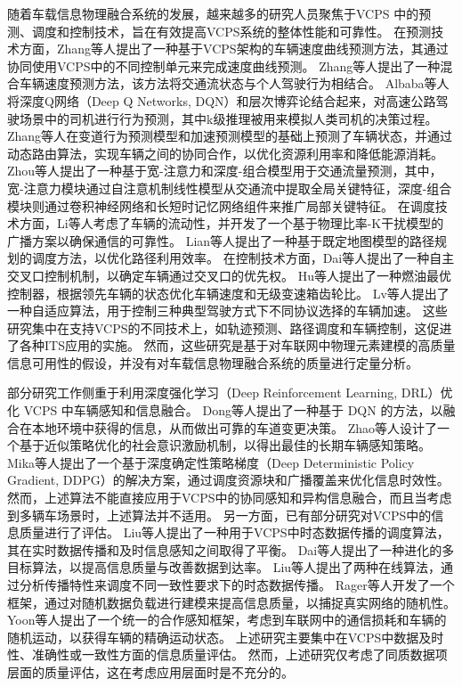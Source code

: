 随着车载信息物理融合系统的发展，越来越多的研究人员聚焦于VCPS 中的预测、调度和控制技术，旨在有效提高VCPS系统的整体性能和可靠性。
在预测技术方面，Zhang等人\cite{zhang2021a}提出了一种基于VCPS架构的车辆速度曲线预测方法，其通过协同使用VCPS中的不同控制单元来完成速度曲线预测。
Zhang等人\cite{zhang2019a}提出了一种混合车辆速度预测方法，该方法将交通流状态与个人驾驶行为相结合。
Albaba等人\cite{albaba2021driver}将深度Q网络（Deep Q Networks, DQN）和层次博弈论结合起来，对高速公路驾驶场景中的司机进行行为预测，其中k级推理被用来模拟人类司机的决策过程。
Zhang等人\cite{zhang2020data}在变道行为预测模型和加速预测模型的基础上预测了车辆状态，并通过动态路由算法，实现车辆之间的协同合作，以优化资源利用率和降低能源消耗。
Zhou等人\cite{zhou2021wide}提出了一种基于宽-注意力和深度-组合模型用于交通流量预测，其中，宽-注意力模块通过自注意机制线性模型从交通流中提取全局关键特征，深度-组合模块则通过卷积神经网络和长短时记忆网络组件来推广局部关键特征。
在调度技术方面，Li等人\cite{li2020cyber}考虑了车辆的流动性，并开发了一个基于物理比率-K干扰模型的广播方案以确保通信的可靠性。
Lian等人\cite{lian2021cyber}提出了一种基于既定地图模型的路径规划的调度方法，以优化路径利用效率。
在控制技术方面，Dai等人\cite{dai2016a}提出了一种自主交叉口控制机制，以确定车辆通过交叉口的优先权。
Hu等人\cite{hu2017cyber}提出了一种燃油最优控制器，根据领先车辆的状态优化车辆速度和无级变速箱齿轮比。
Lv等人\cite{lv2018driving}提出了一种自适应算法，用于控制三种典型驾驶方式下不同协议选择的车辆加速。
这些研究集中在支持VCPS的不同技术上，如轨迹预测、路径调度和车辆控制，这促进了各种ITS应用的实施。
然而，这些研究是基于对车联网中物理元素建模的高质量信息可用性的假设，并没有对车载信息物理融合系统的质量进行定量分析。

部分研究工作侧重于利用深度强化学习（Deep Reinforcement Learning, DRL）优化 VCPS 中车辆感知和信息融合。
Dong等人\cite{dong2020spatio}提出了一种基于 DQN 的方法，以融合在本地环境中获得的信息，从而做出可靠的车道变更决策。
Zhao等人\cite{zhao2020social}设计了一个基于近似策略优化的社会意识激励机制，以得出最佳的长期车辆感知策略。
Mika等人\cite{mlika2022deep}提出了一个基于深度确定性策略梯度（Deep Deterministic Policy Gradient, DDPG）的解决方案，通过调度资源块和广播覆盖来优化信息时效性。
然而，上述算法不能直接应用于VCPS中的协同感知和异构信息融合，而且当考虑到多辆车场景时，上述算法并不适用。
另一方面，已有部分研究对VCPS中的信息质量进行了评估。
Liu等人\cite{liu2014temporal}提出了一种用于VCPS中时态数据传播的调度算法，其在实时数据传播和及时信息感知之间取得了平衡。
Dai等人\cite{dai2019temporal}提出了一种进化的多目标算法，以提高信息质量与改善数据到达率。
Liu等人\cite{liu2014scheduling}提出了两种在线算法，通过分析传播特性来调度不同一致性要求下的时态数据传播。
Rager等人\cite{rager2017scalability}开发了一个框架，通过对随机数据负载进行建模来提高信息质量，以捕捉真实网络的随机性。
Yoon等人\cite{yoon2021performance}提出了一个统一的合作感知框架，考虑到车联网中的通信损耗和车辆的随机运动，以获得车辆的精确运动状态。
上述研究主要集中在VCPS中数据及时性、准确性或一致性方面的信息质量评估。
然而，上述研究仅考虑了同质数据项层面的质量评估，这在考虑应用层面时是不充分的。

